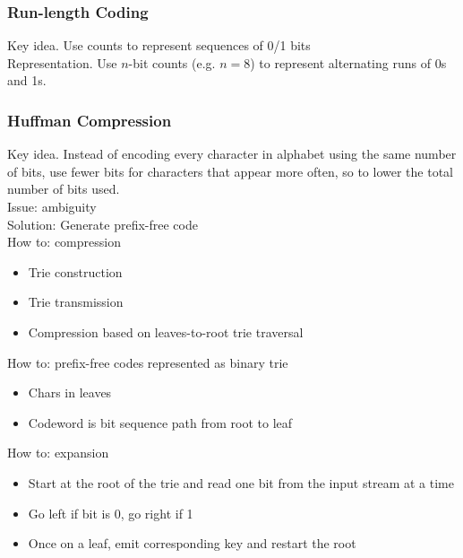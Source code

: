 \documentclass[a4paper]{article}
\begin{document}
\subsubsection*{Run-length Coding}
Key idea. Use counts to represent sequences of 0/1 bits\\
Representation. Use $n$-bit counts (e.g. $n=8$) to represent alternating runs of 0s and 1s.


\subsubsection*{Huffman Compression}
Key idea. Instead of encoding every character in alphabet using the same number of bits, use fewer bits for characters that appear more often, so to lower the total number of bits used.\\
\newline
Issue: ambiguity\\
Solution: Generate prefix-free code\\
\newline
How to: compression
\begin{itemize}
    \item Trie construction
    \item Trie transmission
    \item Compression based on leaves-to-root trie traversal
\end{itemize}
How to: prefix-free codes represented as binary trie
\begin{itemize}
    \item Chars in leaves
    \item Codeword is bit sequence path from root to leaf
\end{itemize}
How to: expansion
\begin{itemize}
    \item Start at the root of the trie and read one bit from the input stream at a time
    \item Go left if bit is 0, go right if 1
    \item Once on a leaf, emit corresponding key and restart the root
\end{itemize}
\end{document}
